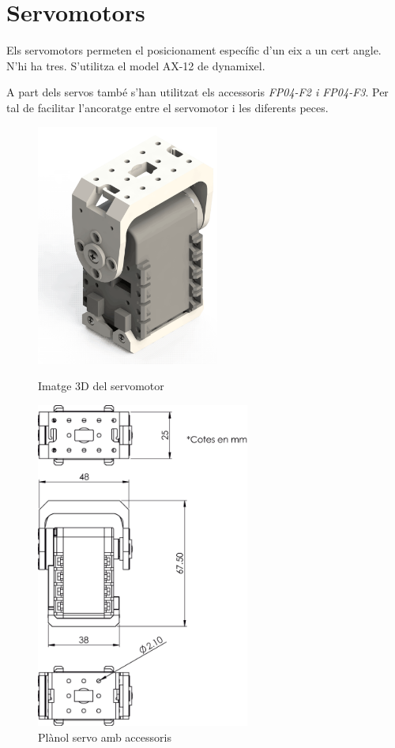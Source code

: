\documentclass[a4paper, 12pt]{article}
\begin{document}
\newpage
\section{Servomotors}
Els servomotors permeten el posicionament específic d'un eix a un cert angle. N'hi ha tres. S'utilitza el model AX-12 de dynamixel. 

A part dels servos també s'han utilitzat els accessoris \emph{FP04-F2 i FP04-F3}. Per tal de facilitar l'ancoratge entre el servomotor i les diferents peces.

\begin{figure}[h!]
\centering
\begin{minipage}[b]{0.45\linewidth}
\centering
\includegraphics[width=6cm]{./imgComp/servo}
\caption{Imatge 3D del servomotor}
\end{minipage}
\begin{minipage}[b]{0.45\linewidth}
\centering
\includegraphics[width=7cm]{./sketch/servo}
\caption{Plànol servo amb accessoris}
\end{minipage}
\end{figure}
\end{document}
